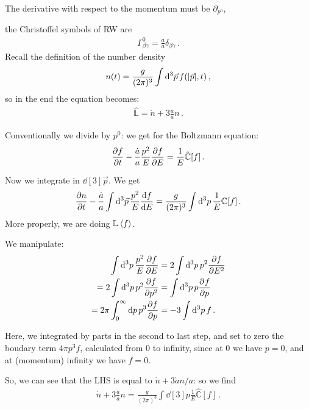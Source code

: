 \documentclass[main.tex]{subfiles}
\begin{document}
The derivative with respect to the momentum must be \(\partial_{p^{0}}\),


the Christoffel symbols of RW are 
%
\begin{align}
  \Gamma^{0}_{\beta \gamma } = \frac{\dot{a}}{a} \delta_{\beta \gamma }
\,.
\end{align}
%
Recall the definition of the number density 
%
\begin{align}
  n(t) = \frac{g}{(2\pi )^3} \int  \dd[3]{\vec{p}} f(\abs{\vec{p}}, t) 
\,,
\end{align}
%
so in the end the equation becomes: 
%
\begin{align}
  \hat{\mathbb{L}} = \dot{n} + 3 \frac{\dot{a}}{a} n 
\,. 
\end{align}
%

Conventionally we divide by \(p^{0}\): we get for the Boltzmann equation: 
%
\begin{align}
  \pdv{f}{t} - \frac{\dot{a}}{a } \frac{p^2}{E} \pdv{f}{E} = \frac{1}{E} \hat{\mathbb{C}} [f]
\,.
\end{align}

Now we integrate in \(\dd[3]{\vec{p}}\). We get 
%
\begin{align}
  \pdv{n}{t} - \frac{\dot{a}}{a } \int  \dd[3]{\vec{p}} \frac{p^2}{E} \dv{f}{E} = \frac{g }{(2\pi )^3} \int  \dd[3]{p} \frac{1}{E} \mathbb{C} [f]  
\,.
\end{align}
%
More properly, we are doing \(\mathbb{L} \expval{f}\). 

We manipulate: 
%
\begin{subequations}
\begin{align}
  \int \dd[3]{p} \frac{p^2}{E} \pdv{f}{E} 
  &= 2 \int \dd[3]{p} p^2 \pdv{f}{E^2} \\
  = 2 \int \dd[3]{p} p^2 \pdv{f}{p^2} 
  &= \int \dd[3]{p} p \pdv[]{f}{p} \\
  = 2 \pi \int_{0}^{ \infty } \dd{p} p^3 \pdv{f}{p} 
  &= -3 \int \dd[3]{p} f
\,.
\end{align}
\end{subequations}
%

Here, we integrated by parts in the second to last step, and set to zero the boudary term \(4 \pi p^3 f\), calculated from 0 to infinity, since at \(0\) we have \(p=0\), and at (momentum) infinity we have \(f=0\).

So, we can see that the LHS is equal to \(\dot{n} + 3 \dot{a}n/a \): so we find 
%
\begin{align}
  \dot{n} + 3 \frac{\dot{a}}{a} n = \frac{g}{(2 \pi )^3} \int \dd[3]{p} \frac{1}{E} \hat{\mathbb{C}} [f]
\,.
\end{align}
\end{document}
